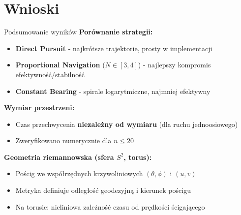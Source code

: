 \documentclass[aspectratio=169,11pt]{beamer}
\begin{document}
\section{Wnioski}

\begin{frame}{Podsumowanie wyników}
\textbf{Porównanie strategii:}
\begin{itemize}
    \item \textbf{Direct Pursuit} - najkrótsze trajektorie, prosty w implementacji
    \item \textbf{Proportional Navigation} ($N \in [3,4]$) - najlepszy kompromis efektywność/stabilność
    \item \textbf{Constant Bearing} - spirale logarytmiczne, najmniej efektywny
\end{itemize}

\vspace{0.4cm}
\textbf{Wymiar przestrzeni:}
\begin{itemize}
    \item Czas przechwycenia \textbf{niezależny od wymiaru} (dla ruchu jednoosiowego)
    \item Zweryfikowano numerycznie dla $n \leq 20$
\end{itemize}

\vspace{0.4cm}
\textbf{Geometria riemannowska (sfera $S^2$, torus):}
\begin{itemize}
    \item Pościg we współrzędnych krzywoliniowych $(\theta, \phi)$ i $(u, v)$
    \item Metryka definiuje odległość geodezyjną i kierunek pościgu
    \item Na torusie: nieliniowa zależność czasu od prędkości ścigającego
\end{itemize}
\end{frame}
\end{document}
